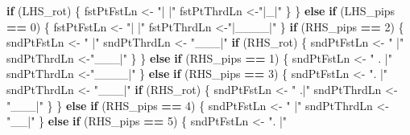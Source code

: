 \documentclass[
]{article}
\newenvironment{Shaded}{\begin{snugshade}}{\end{snugshade}}
\newcommand{\ControlFlowTok}[1]{\textcolor[rgb]{0.13,0.29,0.53}{\textbf{#1}}}
\newcommand{\DecValTok}[1]{\textcolor[rgb]{0.00,0.00,0.81}{#1}}
\newcommand{\NormalTok}[1]{#1}
\newcommand{\OtherTok}[1]{\textcolor[rgb]{0.56,0.35,0.01}{#1}}
\newcommand{\SpecialCharTok}[1]{\textcolor[rgb]{0.81,0.36,0.00}{\textbf{#1}}}
\newcommand{\StringTok}[1]{\textcolor[rgb]{0.31,0.60,0.02}{#1}}
\begin{document}
\begin{Shaded}
\begin{Highlighting}[]
    \ControlFlowTok{if}\NormalTok{ (LHS\_rot) \{}
\NormalTok{      fstPtFstLn }\OtherTok{\textless{}{-}} \StringTok{"|\textquotesingle{}\textquotesingle{}\textquotesingle{} |"}
\NormalTok{      fstPtThrdLn }\OtherTok{\textless{}{-}}\StringTok{"|\textquotesingle{}\textquotesingle{}\textquotesingle{}\_|"}
\NormalTok{    \}}
\NormalTok{  \} }\ControlFlowTok{else} \ControlFlowTok{if}\NormalTok{ (LHS\_pips }\SpecialCharTok{==} \DecValTok{0}\NormalTok{) \{}
\NormalTok{    fstPtFstLn }\OtherTok{\textless{}{-}} \StringTok{"|    |"}
\NormalTok{    fstPtThrdLn }\OtherTok{\textless{}{-}}\StringTok{"|\_\_\_\_|"}
\NormalTok{  \}}
  \ControlFlowTok{if}\NormalTok{ (RHS\_pips }\SpecialCharTok{==} \DecValTok{2}\NormalTok{) \{}
\NormalTok{    sndPtFstLn }\OtherTok{\textless{}{-}}  \StringTok{"\textquotesingle{}   |"}
\NormalTok{    sndPtThrdLn }\OtherTok{\textless{}{-}} \StringTok{"\_\_\textquotesingle{}\_|"}
    \ControlFlowTok{if}\NormalTok{ (RHS\_rot) \{}
\NormalTok{      sndPtFstLn }\OtherTok{\textless{}{-}} \StringTok{"   \textquotesingle{}|"}
\NormalTok{      sndPtThrdLn }\OtherTok{\textless{}{-}}\StringTok{"\_\textquotesingle{}\_\_|"}
\NormalTok{    \}}
\NormalTok{  \} }\ControlFlowTok{else} \ControlFlowTok{if}\NormalTok{ (RHS\_pips }\SpecialCharTok{==} \DecValTok{1}\NormalTok{) \{}
\NormalTok{    sndPtFstLn }\OtherTok{\textless{}{-}} \StringTok{"  . |"}
\NormalTok{    sndPtThrdLn }\OtherTok{\textless{}{-}}\StringTok{"\_\_\_\_|"}
\NormalTok{  \} }\ControlFlowTok{else} \ControlFlowTok{if}\NormalTok{ (RHS\_pips }\SpecialCharTok{==} \DecValTok{3}\NormalTok{) \{}
\NormalTok{    sndPtFstLn }\OtherTok{\textless{}{-}}  \StringTok{"\textquotesingle{}.  |"}
\NormalTok{    sndPtThrdLn }\OtherTok{\textless{}{-}} \StringTok{"\_\_\textquotesingle{}\_|"}
    \ControlFlowTok{if}\NormalTok{ (RHS\_rot) \{}
\NormalTok{      sndPtFstLn }\OtherTok{\textless{}{-}}  \StringTok{"  .\textquotesingle{}|"}
\NormalTok{      sndPtThrdLn }\OtherTok{\textless{}{-}} \StringTok{"\_\textquotesingle{}\_\_|"}
\NormalTok{    \}}
\NormalTok{  \} }\ControlFlowTok{else} \ControlFlowTok{if}\NormalTok{ (RHS\_pips }\SpecialCharTok{==} \DecValTok{4}\NormalTok{) \{}
\NormalTok{    sndPtFstLn }\OtherTok{\textless{}{-}} \StringTok{"\textquotesingle{} \textquotesingle{} |"}
\NormalTok{    sndPtThrdLn }\OtherTok{\textless{}{-}}\StringTok{"\textquotesingle{}\_\textquotesingle{}\_|"}
\NormalTok{  \} }\ControlFlowTok{else} \ControlFlowTok{if}\NormalTok{ (RHS\_pips }\SpecialCharTok{==} \DecValTok{5}\NormalTok{) \{}
\NormalTok{    sndPtFstLn }\OtherTok{\textless{}{-}} \StringTok{"\textquotesingle{}.\textquotesingle{} |"}

\end{Highlighting}
\end{Shaded}
\end{document}
